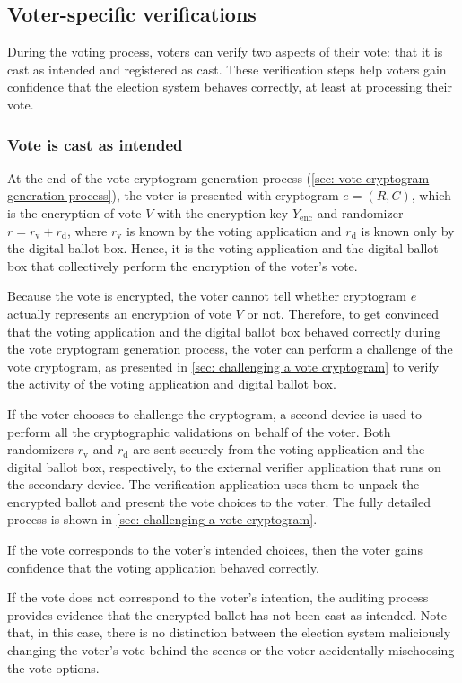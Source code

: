 \subsection{Voter-specific verifications} \label{sec: voter-specific verifications}
During the voting process, voters can verify two aspects of their vote: that it is cast as intended and registered as cast. These verification steps help voters gain confidence that the election system behaves correctly, at least at processing their vote.


\subsubsection{Vote is cast as intended}
At the end of the vote cryptogram generation process (\cref{sec: vote cryptogram generation process}), the voter is presented with cryptogram $e = (R, C)$, which is the encryption of vote $V$ with the encryption key $Y_\mathrm{enc}$ and randomizer $r = r_\mathrm{v} + r_\mathrm{d}$, where $r_\mathrm{v}$ is known by the voting application and $r_\mathrm{d}$ is known only by the digital ballot box. Hence, it is the voting application and the digital ballot box that collectively perform the encryption of the voter's vote.

Because the vote is encrypted, the voter cannot tell whether cryptogram $e$ actually represents an encryption of vote $V$ or not. Therefore, to get convinced that the voting application and the digital ballot box behaved correctly during the vote cryptogram generation process, the voter can perform a challenge of the vote cryptogram, as presented in \cref{sec: challenging a vote cryptogram} to verify the activity of the voting application and digital ballot box.

If the voter chooses to challenge the cryptogram, a second device is used to perform all the cryptographic validations on behalf of the voter. Both randomizers $r_\mathrm{v}$ and $r_\mathrm{d}$ are sent securely from the voting application and the digital ballot box, respectively, to the external verifier application that runs on the secondary device. The verification application uses them to unpack the encrypted ballot and present the vote choices to the voter. The fully detailed process is shown in \cref{sec: challenging a vote cryptogram}.

If the vote corresponds to the voter's intended choices, then the voter gains confidence that the voting application behaved correctly.

If the vote does not correspond to the voter's intention, the auditing process provides evidence that the encrypted ballot has not been cast as intended. Note that, in this case, there is no distinction between the election system maliciously changing the voter's vote behind the scenes or the voter accidentally mischoosing the vote options.

